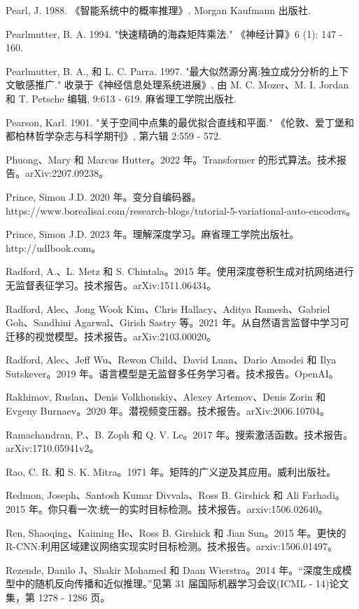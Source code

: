 \documentclass[10pt]{report}
\begin{document}
Pearl, J. 1988. 《智能系统中的概率推理》. Morgan Kaufmann 出版社.

Pearlmutter, B. A. 1994. "快速精确的海森矩阵乘法." 《神经计算》6 (1): 147 - 160.

Pearlmutter, B. A., 和 L. C. Parra. 1997. "最大似然源分离:独立成分分析的上下文敏感推广." 收录于《神经信息处理系统进展》, 由 M. C. Mozer、M. I. Jordan 和 T. Petsche 编辑, 9:613 - 619. 麻省理工学院出版社.

Pearson, Karl. 1901. "关于空间中点集的最优拟合直线和平面." 《伦敦、爱丁堡和都柏林哲学杂志与科学期刊》, 第六辑 2:559 - 572.

Phuong、Mary 和 Marcus Hutter。2022 年。Transformer 的形式算法。技术报告。arXiv:2207.09238。

Prince, Simon J.D. 2020 年。变分自编码器。https://www.borealisai.com/research-blogs/tutorial-5-variational-auto-encoders。

Prince, Simon J.D. 2023 年。理解深度学习。麻省理工学院出版社。http://udlbook.com。

Radford, A.、L. Metz 和 S. Chintala。2015 年。使用深度卷积生成对抗网络进行无监督表征学习。技术报告。arXiv:1511.06434。

Radford, Alec、Jong Wook Kim、Chris Hallacy、Aditya Ramesh、Gabriel Goh、Sandhini Agarwal、Girish Sastry 等。2021 年。从自然语言监督中学习可迁移的视觉模型。技术报告。arXiv:2103.00020。

Radford, Alec、Jeff Wu、Rewon Child、David Luan、Dario Amodei 和 Ilya Sutskever。2019 年。语言模型是无监督多任务学习者。技术报告。OpenAI。

Rakhimov, Ruslan、Denis Volkhonskiy、Alexey Artemov、Denis Zorin 和 Evgeny Burnaev。2020 年。潜视频变压器。技术报告。arXiv:2006.10704。

Ramachandran, P.、B. Zoph 和 Q. V. Le。2017 年。搜索激活函数。技术报告。arXiv:1710.05941v2。

Rao, C. R. 和 S. K. Mitra。1971 年。矩阵的广义逆及其应用。威利出版社。

Redmon, Joseph、Santosh Kumar Divvala、Ross B. Girshick 和 Ali Farhadi。2015 年。你只看一次:统一的实时目标检测。技术报告。arxiv:1506.02640。

Ren, Shaoqing、Kaiming He、Ross B. Girshick 和 Jian Sun。2015 年。更快的 R-CNN:利用区域建议网络实现实时目标检测。技术报告。arxiv:1506.01497。

Rezende, Danilo J、Shakir Mohamed 和 Daan Wierstra。2014 年。“深度生成模型中的随机反向传播和近似推理。”见第 31 届国际机器学习会议(ICML - 14)论文集，第 1278 - 1286 页。
\end{document}

